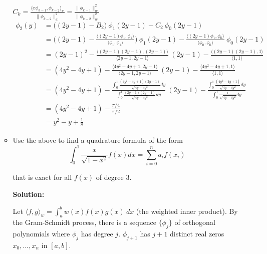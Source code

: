 \documentclass[a4paper,11pt]{report}
\begin{document}
\begin{enumerate}
\begin{itemize}
    $C_{k} = \displaystyle \frac{\langle x \phi_{k-1}, \phi_{k-2} \rangle_{w}}
    {\| \phi_{k-2} \|_{w}^{2}} = \frac{\| \phi_{k-1} \|_{w}^{2}}{\| \phi_{k-2}
    \|_{w}^{2}}$
    \begin{equation*}
    \begin{aligned}
    \phi_{2}(y) &= \big((2y-1) - B_{2}\big)\ \phi_{1}(2y-1) - C_{2}\ 
    \phi_{0}(2y-1) \\
                &= \bigg((2y-1) - \frac{\langle (2y-1) \phi_{1}, \phi_{1} 
    \rangle}{\langle \phi_{1}, \phi_{1} \rangle}\bigg)\ \phi_{1}(2y-1) - 
    \frac{\langle (2y-1) \phi_{1}, \phi_{0} \rangle}{\langle \phi_{0}, 
    \phi_{0} \rangle}\ \phi_{0}(2y-1) \\
                &= (2y-1)^2 - \frac{\langle (2y-1)(2y-1), (2y-1) \rangle}
    {\langle 2y-1, 2y-1 \rangle}\ (2y-1) - \frac{\langle (2y-1)(2y-1), 1 
    \rangle}{\langle 1, 1 \rangle} \\
                &= (4y^2 - 4y + 1) - \frac{\langle 4y^2 - 4y + 1, 2y-1 \rangle}
    {\langle 2y-1, 2y-1 \rangle}\ (2y-1) - \frac{\langle 4y^2 - 4y + 1, 1 
    \rangle}{\langle 1, 1 \rangle} \\
                &= (4y^2 - 4y + 1) - \frac{\displaystyle \int_{0}^{1} 
    \frac{(4y^2 - 4y + 1)(2y-1)}{\sqrt{4y-4y^2}} dy}{\displaystyle \int_{0}^{1}
    \frac{(2y-1)(2y-1)}{\sqrt{4y-4y^2}} dy}\ (2y-1) - \frac{\displaystyle 
    \int_{0}^{1} \frac{(4y^2 - 4y + 1)}{\sqrt{4y-4y^2}} dy}{\displaystyle 
    \int_{0}^{1} \frac{1}{\sqrt{4y-4y^2}} dy} \\
                &= (4y^2 - 4y + 1) - \displaystyle \frac{\pi/4}{\pi/2} \\
                &= y^2 - y + \frac{1}{8}
    \end{aligned}
    \end{equation*}

    \vspace{0.5cm}
    
    \item Use the above to find a quadrature formula of the form
    \begin{equation*}
    \int_{0}^{1} \frac{x}{\sqrt{1 - x^{2}}} f(x) dx = \sum_{i=0}^{n} a_{i} 
    f(x_{i})
    \end{equation*}

    that is exact for all $f(x)$ of degree $3$.

    \textbf{Solution:} 

    Let $\langle f, g \rangle_{w} = \displaystyle \int_{a}^{b} w(x) f(x) 
    g(x)\ dx$ (the weighted inner product). By the Gram-Schmidt process, 
    there is a sequence $\{\phi_{j}\}$ of orthogonal polynomials where 
    $\phi_{j}$ has degree $j$. $\phi_{j+1}$ has $j+1$ distinct real zeros 
    $x_{0}, ..., x_{n}$ in $[a, b]$. 


\end{itemize}
\end{enumerate}
\end{document}
